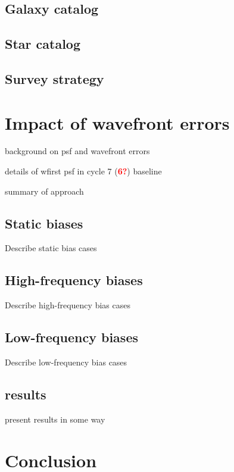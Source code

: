 \documentclass[aps,prd, amsmath,amssymb,superscriptaddress,showkeys,nofootinbib,reprint,preprintnumbers]{revtex4-1}
\newcommand{\verify}[1]{\textcolor{red}{\textbf{{#1}}}}
\begin{document}
\subsection{Galaxy catalog}
\subsection{Star catalog}
\subsection{Survey strategy}

\section{Impact of wavefront errors}\label{sec:results}

background on psf and wavefront errors

details of wfirst psf in cycle 7 (\verify{6?}) baseline

summary of approach 

\subsection{Static biases}\label{sec:static}

Describe static bias cases

\subsection{High-frequency biases}\label{sec:low}

Describe high-frequency bias cases

\subsection{Low-frequency biases}\label{sec:high}

Describe low-frequency bias cases

\subsection{results}\label{sec:results}

present results in some way

\section{Conclusion}\label{sec:conclusion}
\end{document}
